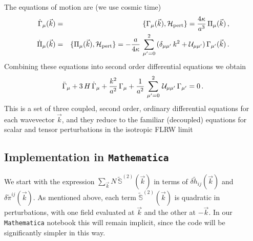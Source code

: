 \documentclass[11pt,tightenlines,eqsecnum,floats,aps,amsmath,amssymb,nofootinbib,prd,floatfix]{revtex4}
\newcommand{\be}{\nopagebreak[3]\begin{equation}}
\newcommand{\ee}{\end{equation}}
\newcommand{\bea}{\nopagebreak[3]\begin{eqnarray}}
\newcommand{\ea}{\end{eqnarray}}
\newcommand{\<}{\langle}
\renewcommand{\>}{\rangle}
\begin{document}
The equations of motion are (we use cosmic time) %
\bea \label{perteqH} \dot \Gamma_{\mu}(\vec k)&=&\{\Gamma_{\mu}(\vec k),\mathcal{H_{\rm pert}}\}=\frac{4\kappa}{a^3}\, \Pi_{\mu}(\vec k)\, ,\nonumber \\ 
 \dot \Pi_{\mu}(\vec k)&=&\{\Pi_{\mu}(\vec k),\mathcal{H_{\rm pert}}\}=-\frac{a}{4\kappa}\,\sum_{\mu'=0}^2\,  (\delta_{\mu\mu'}\, k^2+ {\cal U}_{\mu \mu'})\, \Gamma_{\mu'}(\vec k)\, . \ea
Combining these equations into second order differential equations we obtain
%
\be \label{eqginper}\ddot \Gamma_{\mu}+3\, H\, \dot \Gamma_{\mu}+\frac{k^2}{a^2}\,  \Gamma_{\mu}+\frac{1}{a^2}\, \sum_{\mu'=0}^2\, {\cal U}_{\mu\mu'}\, \Gamma_{\mu'}=0\, . \ee
%
This is a  set of three coupled, second order, ordinary differential equations for each wavevector $\vec k$, and they reduce to the familiar (decoupled) equations for scalar and tensor perturbations in the isotropic FLRW limit 



\subsection{Implementation in {\tt Mathematica}}

We start with the expression $\sum_{\vec {k}} N \, \tilde{\mathbb{S}}^{(2)}(\vec k)$ in terms of  $\delta \tilde{h}_{ij}(\vec k)$ and $\delta \tilde{\pi}^{ij}(\vec k)$. As mentioned above, each term $\tilde{\mathbb{S}}^{(2)}(\vec k)$  is quadratic in perturbations, with one field evaluated at $\vec k$ and the other at $-\vec k$. In our {\tt Mathematica} notebook this will remain implicit, since the code will be significantly simpler in this way. 
\end{document}
